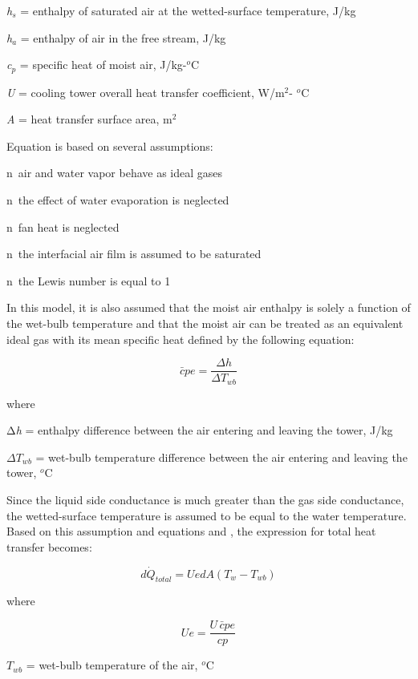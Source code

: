 \emph{h\(_{s}\)} = enthalpy of saturated air at the wetted-surface temperature, J/kg

\emph{h\(_{a}\)} = enthalpy of air in the free stream, J/kg

\emph{c\(_{p}\)} = specific heat of moist air, J/kg-\(^{o}\)C

\emph{U} = cooling tower overall heat transfer coefficient, W/m\(^{2}\)- \(^{o}\)C

\emph{A} = heat transfer surface area, m\(^{2}\)

Equation is based on several assumptions:

n~air and water vapor behave as ideal gases

n~the effect of water evaporation is neglected

n~fan heat is neglected

n~the interfacial air film is assumed to be saturated

n~the Lewis number is equal to 1

In this model, it is also assumed that the moist air enthalpy is solely a function of the wet-bulb temperature and that the moist air can be treated as an equivalent ideal gas with its mean specific heat defined by the following equation:

\begin{equation}
\bar cpe = \frac{{\Delta h}}{{\Delta {T_{wb}}}}
\end{equation}

where

Δ\emph{h} = enthalpy difference between the air entering and leaving the tower, J/kg

\(\Delta T_{wb}\) = wet-bulb temperature difference between the air entering and leaving the tower, \(^{o}\)C

Since the liquid side conductance is much greater than the gas side conductance, the wetted-surface temperature is assumed to be equal to the water temperature. Based on this assumption and equations and , the expression for total heat transfer becomes:

\begin{equation}
d{\dot Q_{total}} = UedA\left( {{T_w} - {T_{wb}}} \right)
\end{equation}

where

\begin{equation}
Ue = \frac{{U\,\bar cpe}}{{cp}}
\end{equation}

\(T_{wb}\) = wet-bulb temperature of the air, \(^{o}\)C

